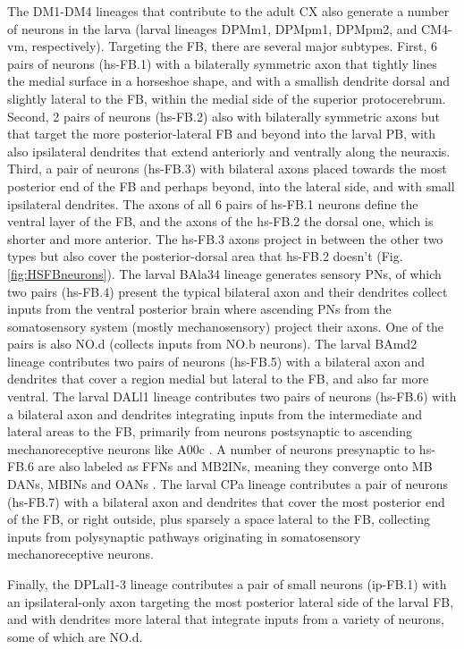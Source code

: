     The DM1-DM4 lineages that contribute to the adult CX also generate a number of neurons in the larva (larval lineages DPMm1, DPMpm1, DPMpm2, and CM4-vm, respectively). Targeting the FB, there are several major subtypes. First, 6 pairs of neurons (hs-FB.1) with a bilaterally symmetric axon that tightly lines the medial surface in a horseshoe shape, and with a smallish dendrite dorsal and slightly lateral to the FB, within the medial side of the superior protocerebrum. Second, 2 pairs of neurons (hs-FB.2) also with bilaterally symmetric axons but that target the more posterior-lateral FB and beyond into the larval PB,
    with also ipsilateral dendrites that extend anteriorly and ventrally along the neuraxis.
    Third, a pair of neurons (hs-FB.3) with bilateral axons placed towards the most posterior end of the FB and perhaps beyond, into the lateral side, and with small ipsilateral dendrites.
    The axons of all 6 pairs of hs-FB.1 neurons define the ventral layer of the FB, and the axons of the hs-FB.2 the dorsal one, which is shorter and more anterior. The hs-FB.3 axons project in between the other two types but also cover the posterior-dorsal area that hs-FB.2 doesn't (Fig. \ref{fig:HSFBneurons}). 
    The larval BAla34 lineage generates sensory PNs, of which two pairs (hs-FB.4) present the typical bilateral axon and their dendrites collect inputs from the ventral posterior brain where ascending PNs from the somatosensory system (mostly mechanosensory) project their axons. One of the pairs is also NO.d (collects inputs from NO.b neurons).
    The larval BAmd2 lineage contributes two pairs of neurons (hs-FB.5) with a bilateral axon and dendrites that cover a region medial but lateral to the FB, and also far more ventral.
    The larval DALl1 lineage contributes two pairs of neurons (hs-FB.6) with a bilateral axon and dendrites integrating inputs from the intermediate and lateral areas to the FB, primarily from neurons postsynaptic to ascending mechanoreceptive neurons like A00c \citep{ohyama2015multilevel}. A number of neurons presynaptic to hs-FB.6 are also labeled as FFNs and MB2INs, meaning they converge onto MB DANs, MBINs and OANs \citep{eschbach2020recurrent}.
    The larval CPa lineage contributes a pair of neurons (hs-FB.7) with a bilateral axon and dendrites that cover the most posterior end of the FB, or right outside, plus sparsely a space lateral to the FB, collecting inputs from polysynaptic pathways originating in somatosensory mechanoreceptive neurons.


    Finally, the DPLal1-3 lineage contributes a pair of small neurons (ip-FB.1) with an ipsilateral-only axon targeting the most posterior lateral side of the larval FB, and with dendrites more lateral that integrate inputs from a variety of neurons, some of which are NO.d.

